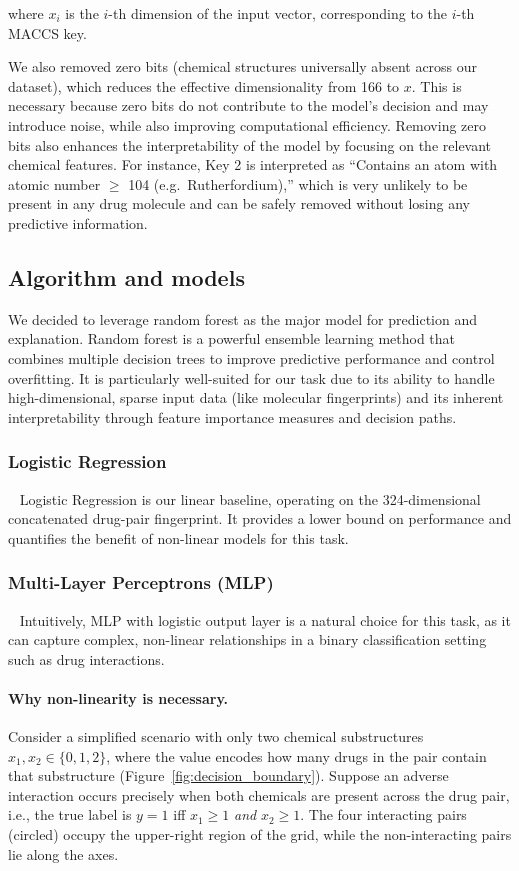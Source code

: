 \documentclass[letterpaper]{article} %
\begin{document}
where $x_i$ is the $i$-th dimension of the input vector, corresponding to the $i$-th MACCS key. 

We also removed zero bits (chemical structures universally absent across our dataset), which reduces the effective dimensionality from 166 to $x$. This is necessary because zero bits do not contribute to the model's decision and may introduce noise, while also improving computational efficiency. Removing zero bits also enhances the interpretability of the model by focusing on the relevant chemical features. For instance, Key 2 is interpreted as ``Contains an atom with atomic number $\geq$ 104 (e.g.\ Rutherfordium),'' which is very unlikely to be present in any drug molecule and can be safely removed without losing any predictive information.

\subsection{Algorithm and models}
We decided to leverage random forest as the major model for prediction and explanation. Random forest is a powerful ensemble learning method that combines multiple decision trees to improve predictive performance and control overfitting. It is particularly well-suited for our task due to its ability to handle high-dimensional, sparse input data (like molecular fingerprints) and its inherent interpretability through feature importance measures and decision paths.

\subsubsection{Logistic Regression}
\
\newline
Logistic Regression is our linear baseline, operating on the 324-dimensional concatenated drug-pair fingerprint. It provides a lower bound on performance and quantifies the benefit of non-linear models for this task.

\subsubsection{Multi-Layer Perceptrons (MLP)}
\ 
\newline
Intuitively, MLP with logistic output layer is a natural choice for this task, as it can capture complex, non-linear relationships in a binary classification setting such as drug interactions.
\paragraph{Why non-linearity is necessary.}
Consider a simplified scenario with only two chemical substructures $x_1, x_2 \in \{0,1,2\}$, where the value encodes how many drugs in the pair contain that substructure (Figure~\ref{fig:decision_boundary}). Suppose an adverse interaction occurs precisely when both chemicals are present across the drug pair, i.e., the true label is $y=1$ iff $x_1 \geq 1$ \emph{and} $x_2 \geq 1$. The four interacting pairs (circled) occupy the upper-right region of the grid, while the non-interacting pairs lie along the axes.
\end{document}
